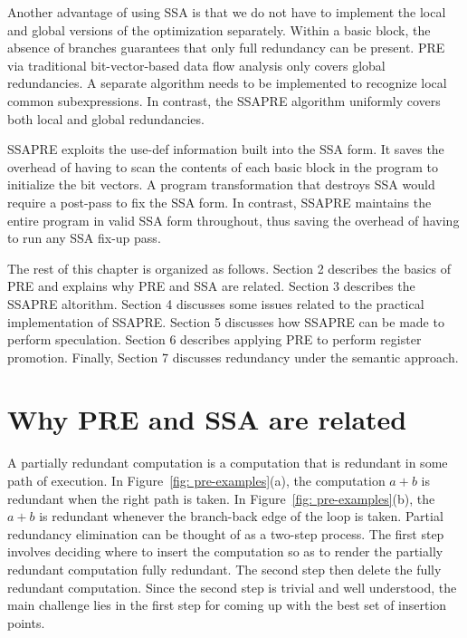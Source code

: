 Another advantage of using SSA is that we do not have to implement the local
and global versions of the optimization separately.  Within a basic block,
the absence of branches guarantees that only full redundancy can be present.
PRE via traditional bit-vector-based data flow analysis only covers global
redundancies.  A separate algorithm needs to be implemented to recognize
local common subexpressions.  In contrast, the SSAPRE algorithm uniformly
covers both local and global redundancies.

SSAPRE exploits the use-def information built into the SSA form.  It saves
the overhead of having to scan the contents of each basic block in the
program to initialize the bit vectors.  A program transformation that
destroys SSA would require a post-pass to fix the SSA form.  In contrast,
SSAPRE maintains the entire program in valid SSA form throughout,
thus saving the overhead of having to run any SSA fix-up pass.

The rest of this chapter is organized as follows.  Section 2 describes
the basics of PRE and explains why PRE and SSA are related.
Section 3 describes the SSAPRE altorithm.
Section 4 discusses some issues related to the practical implementation 
of SSAPRE.
Section 5 discusses how SSAPRE can be made to perform speculation.
Section 6 describes applying PRE to perform register promotion.
Finally, Section 7 discusses redundancy under the semantic approach.

\section{Why PRE and SSA are related}
\label{section:Part3:Pre_not_helped:PRErelatedtoSSA}

A partially redundant computation is a computation that is redundant in
some path of execution.  In Figure~\ref{fig: pre-examples}(a), the
computation $a+b$ is redundant when the right path is taken.
In Figure~\ref{fig: pre-examples}(b), the $a+b$ is redundant whenever
the branch-back edge of the loop is taken.
Partial redundancy elimination can be thought of as a two-step process.
The first step involves deciding where to insert the computation so as to
render the partially redundant computation fully redundant.  The second
step then delete the fully redundant computation.  Since the second step is
trivial and well understood, the main challenge lies in the first step
for coming up with the best set of insertion points.

